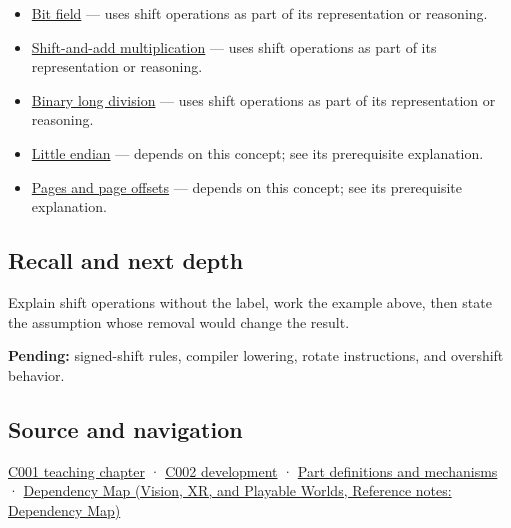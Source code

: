 \begin{itemize}
\item
  \hyperref[appendix-ac697f5c66e8]{Bit field} --- uses shift operations as part of its representation or reasoning.
\item
  \hyperref[appendix-a65290d66ed9]{Shift-and-add multiplication} --- uses shift operations as part of its representation or reasoning.
\item
  \hyperref[appendix-89985e6a2685]{Binary long division} --- uses shift operations as part of its representation or reasoning.
\item
  \hyperref[appendix-367b6abf460e]{Little endian} --- depends on this concept; see its prerequisite explanation.
\item
  \hyperref[appendix-0c67cd5bf30a]{Pages and page offsets} --- depends on this concept; see its prerequisite explanation.
\end{itemize}

\subsection{Recall and next depth}\label{appendix-73425b25118e-recall-and-next-depth}

Explain shift operations without the label, work the example above, then state the assumption whose removal would change the result.

\textbf{Pending:} signed-shift rules, compiler lowering, rotate instructions, and overshift behavior.

\subsection{Source and navigation}\label{appendix-73425b25118e-source-and-navigation}

\hyperref[01-foundations-i-ch001-from-a-signal-to-an-interpretation]{C001 teaching chapter} · \hyperref[01-foundations-i-ch001-arithmetic-becomes-a-policy]{C002 development} · \hyperref[appendix-fd090d982a15]{Part definitions and mechanisms} · \href{../07-Vision-XR-and-Playable-Worlds/main.pdf\#nameddest=appendix-4ad47bdd269a}{Dependency Map (Vision, XR, and Playable Worlds, Reference notes: Dependency Map)}
